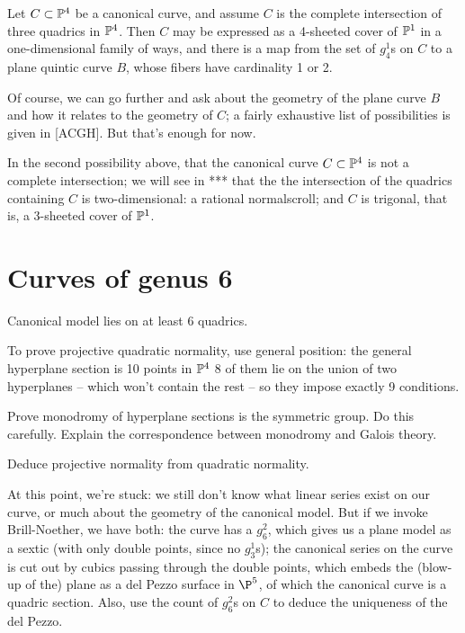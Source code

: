 \begin{proposition}
Let $C \subset \PP^4$ be a canonical curve, and assume $C$ is the complete intersection of three quadrics in $\PP^4$. Then $C$ may be expressed as a 4-sheeted cover of $\PP^1$ in a one-dimensional family of ways, and there is a map from the set of $g^1_4$s on $C$ to a plane quintic curve $B$, whose fibers have cardinality 1 or 2.
\end{proposition}

Of course, we can go further and ask about the geometry of the plane curve $B$ and how it relates to the geometry of $C$; a fairly exhaustive list of possibilities is given in \cite{****} [ACGH]. But that's enough for now.

In the second possibility above, that the canonical curve $C \subset \PP^4$ is not a complete intersection; we will see in *** that the
 the intersection of the quadrics containing $C$ is two-dimensional: a rational normalscroll;  and  $C$ is trigonal, that is, a 3-sheeted cover of $\PP^1$. 

\section{Curves of genus 6}
Canonical model lies on at least 6 quadrics. 

To prove projective quadratic normality,  use general position: the general hyperplane section is 10 points in $\PP^4$ 8 of them lie on the union of two hyperplanes -- which won't contain the rest -- so they impose exactly 9 conditions. 

Prove monodromy of hyperplane sections is the symmetric group. Do this carefully. Explain the correspondence between monodromy and Galois theory. 

Deduce projective normality from quadratic normality.

At this point, we're stuck: we still don't know what linear series exist on our curve, or much about the geometry of the canonical model. But if we invoke Brill-Noether, we have both: the curve has a $g^2_6$, which gives us a plane model as a sextic (with only double points, since no $g^1_3$s); the canonical series on the curve is cut out by cubics passing through the double points, which embeds the (blow-up of the) plane as a del Pezzo surface in $\P^5$, of which the canonical curve is a quadric section. Also, use the count of $g^2_6$s on $C$ to deduce the uniqueness of the del Pezzo.





